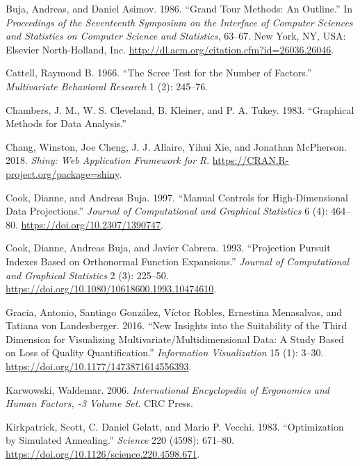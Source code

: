 \documentclass[
  11,
]{article}
\begin{document}
\leavevmode\hypertarget{ref-buja_grand_1986}{}%
Buja, Andreas, and Daniel Asimov. 1986. ``Grand Tour Methods: An Outline.'' In \emph{Proceedings of the Seventeenth Symposium on the Interface of Computer Sciences and Statistics on Computer Science and Statistics}, 63--67. New York, NY, USA: Elsevier North-Holland, Inc. \url{http://dl.acm.org/citation.cfm?id=26036.26046}.

\leavevmode\hypertarget{ref-cattell_scree_1966}{}%
Cattell, Raymond B. 1966. ``The Scree Test for the Number of Factors.'' \emph{Multivariate Behavioral Research} 1 (2): 245--76.

\leavevmode\hypertarget{ref-chambers_graphical_1983}{}%
Chambers, J. M., W. S. Cleveland, B. Kleiner, and P. A. Tukey. 1983. ``Graphical Methods for Data Analysis.''

\leavevmode\hypertarget{ref-chang_shiny:_2018}{}%
Chang, Winston, Joe Cheng, J. J. Allaire, Yihui Xie, and Jonathan McPherson. 2018. \emph{Shiny: Web Application Framework for R}. \url{https://CRAN.R-project.org/package=shiny}.

\leavevmode\hypertarget{ref-cook_manual_1997}{}%
Cook, Dianne, and Andreas Buja. 1997. ``Manual Controls for High-Dimensional Data Projections.'' \emph{Journal of Computational and Graphical Statistics} 6 (4): 464--80. \url{https://doi.org/10.2307/1390747}.

\leavevmode\hypertarget{ref-cook_projection_1993}{}%
Cook, Dianne, Andreas Buja, and Javier Cabrera. 1993. ``Projection Pursuit Indexes Based on Orthonormal Function Expansions.'' \emph{Journal of Computational and Graphical Statistics} 2 (3): 225--50. \url{https://doi.org/10.1080/10618600.1993.10474610}.

\leavevmode\hypertarget{ref-gracia_new_2016}{}%
Gracia, Antonio, Santiago González, Víctor Robles, Ernestina Menasalvas, and Tatiana von Landesberger. 2016. ``New Insights into the Suitability of the Third Dimension for Visualizing Multivariate/Multidimensional Data: A Study Based on Loss of Quality Quantification.'' \emph{Information Visualization} 15 (1): 3--30. \url{https://doi.org/10.1177/1473871614556393}.

\leavevmode\hypertarget{ref-karwowski_international_2006}{}%
Karwowski, Waldemar. 2006. \emph{International Encyclopedia of Ergonomics and Human Factors, -3 Volume Set}. CRC Press.

\leavevmode\hypertarget{ref-kirkpatrick_optimization_1983}{}%
Kirkpatrick, Scott, C. Daniel Gelatt, and Mario P. Vecchi. 1983. ``Optimization by Simulated Annealing.'' \emph{Science} 220 (4598): 671--80. \url{https://doi.org/10.1126/science.220.4598.671}.
\end{document}
